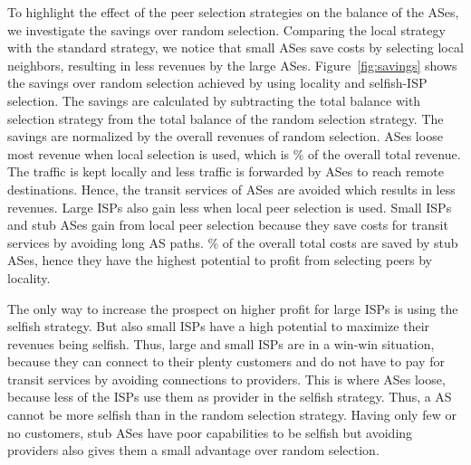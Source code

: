 To highlight the effect of the peer selection strategies on the balance of the ASes, we investigate the savings over random selection.
Comparing the local strategy with the standard strategy, we notice that small ASes save costs by selecting local neighbors, resulting in less revenues by the large ASes.
Figure~\ref{fig:savings} shows the savings over random selection achieved by using locality and selfish-ISP selection. The savings are calculated by subtracting the total balance with selection strategy from the total balance of the random selection strategy. The savings are normalized by the overall revenues of random selection. \tier ASes loose most revenue when local selection is used, which is \unit[10]{\%} of the overall total revenue. The traffic is kept locally and less traffic is forwarded by \tier ASes to reach remote destinations. Hence, the transit services of \tier ASes are avoided which results in less revenues. Large ISPs also gain less when local peer selection is used. Small ISPs and stub ASes gain from local peer selection because they save costs for transit services by avoiding long AS paths. \unit[10]{\%} of the overall total costs are saved by stub ASes, hence they have the highest potential to profit from selecting peers by locality.



The only way to increase the prospect on higher profit for large ISPs is using the selfish strategy. But also small ISPs have a high potential to maximize their revenues being selfish. Thus, large and small ISPs are in a win-win situation, because they can connect to their plenty customers and do not have to pay for transit services by avoiding connections to providers. This is where \tier ASes loose, because less of the ISPs use them as provider in the selfish strategy. Thus, a \tier AS cannot be more selfish than in the random selection strategy. Having only few or no customers, stub ASes have poor capabilities to be selfish but avoiding providers also gives them a small advantage over random selection.

